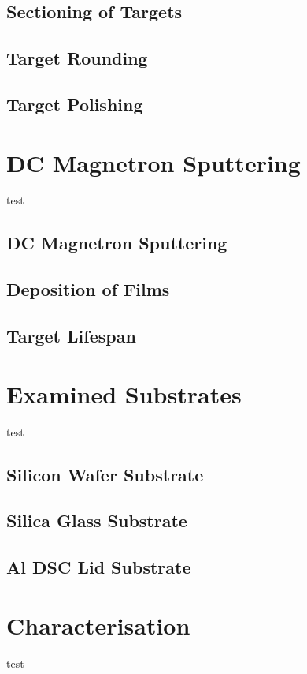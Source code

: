 \documentclass[a4paper,12pt,oneside]{report}%
\begin{document}
\subsection{Sectioning of Targets}

\subsection{Target Rounding}

\subsection{Target Polishing}

\section{DC Magnetron Sputtering}
test
\subsection{DC Magnetron Sputtering}

\subsection{Deposition of Films}

\subsection{Target Lifespan}

\section{Examined Substrates} 
test
\subsection{Silicon Wafer Substrate}

\subsection{Silica Glass Substrate}

\subsection{Al DSC Lid Substrate}

\section{Characterisation}
test
\end{document}
